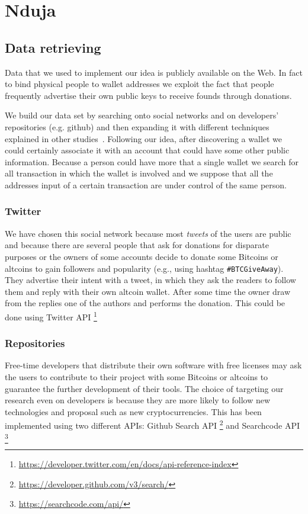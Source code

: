 \section{Nduja}

\subsection{Data retrieving}
Data that we used to implement our idea is publicly available on the Web. In
fact to bind physical people to wallet addresses we exploit the fact that
people frequently advertise their own public keys to receive founds
through donations.

We build our data set by searching onto social networks and on developers'
repositories (e.g. github) and then expanding it with different techniques
explained in other studies~\cite{fistful}. Following our idea, after discovering
a wallet we could certainly associate it with an account that could have some
other public information. Because a person could have more that a single wallet
we search for all transaction in which the wallet is involved and we suppose
that all the addresses input of a certain transaction are under control of the
same person.

\subsubsection*{Twitter}
We have chosen this social network because most \textit{tweets} of the users are
public and because there are several people that ask for donations 
for disparate purposes or the owners of some accounts decide to donate some
Bitcoins or altcoins to gain followers and popularity (e.g., using hashtag
\texttt{\#BTCGiveAway}). They advertise their intent with a tweet, in which
they ask the readers to follow them and reply with their own altcoin wallet.
After some time the owner draw from the replies one of the authors and performs
the donation. This could be done using Twitter API
\footnote{\url{https://developer.twitter.com/en/docs/api-reference-index}}

\subsubsection*{Repositories}
Free-time developers that distribute their own software with free licenses may
ask the users to contribute to their project with some Bitcoins or altcoins to
guarantee the further development of their tools. The choice of targeting our
research even on developers is because they are more likely to follow new
technologies and proposal such as new cryptocurrencies. This has been
implemented using two different APIs: Github Search API
\footnote{\url{https://developer.github.com/v3/search/}} and Searchcode API
\footnote{\url{https://searchcode.com/api/}}

